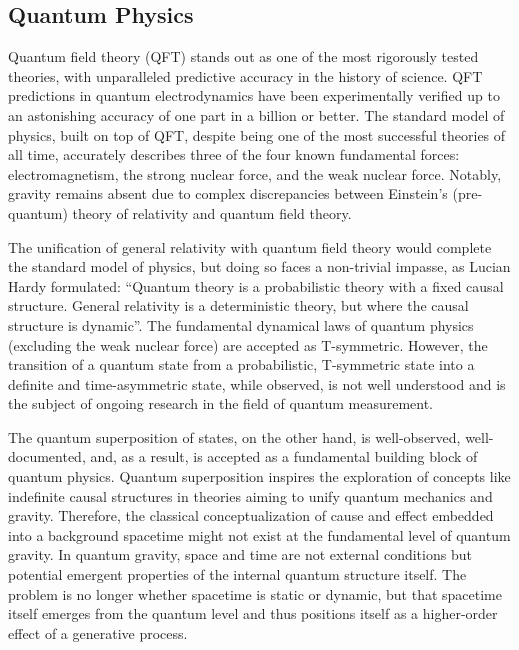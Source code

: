 \subsection{Quantum Physics}
\label{sec:history_quantum}

Quantum field theory\cite{peskin2018introduction} (QFT) stands out as one of the most rigorously tested theories, with unparalleled predictive accuracy in the history of science. QFT predictions in quantum electrodynamics have been experimentally verified up to an astonishing accuracy of one part in a billion or better. The standard model of physics, built on top of QFT, despite being one of the most successful theories of all time, accurately describes three of the four known fundamental forces: electromagnetism, the strong nuclear force, and the weak nuclear force. Notably, gravity remains absent due to complex discrepancies between Einstein’s (pre-quantum) theory of relativity and quantum field theory.

The unification of general relativity with quantum field theory would complete the standard model of physics, but doing so faces a non-trivial impasse, as Lucian Hardy formulated: ``Quantum theory is a probabilistic theory with a fixed causal structure. General relativity is a deterministic theory, but where the causal structure is dynamic''\cite{HardyDynamicCausalStructure}. The fundamental dynamical laws of quantum physics (excluding the weak nuclear force) are accepted as T-symmetric. However, the transition of a quantum state from a probabilistic, T-symmetric state into a definite and time-asymmetric state, while observed, is not well understood and is the subject of ongoing research in the field of quantum measurement.

The quantum superposition of states, on the other hand, is well-observed, well-documented, and, as a result, is accepted as a fundamental building block of quantum physics. Quantum superposition inspires the exploration of concepts like indefinite causal structures in theories aiming to unify quantum mechanics and gravity. Therefore, the classical conceptualization of cause and effect embedded into a background spacetime might not exist at the fundamental level of quantum gravity. In quantum gravity, space and time are not external conditions but potential emergent properties of the internal quantum structure itself. The problem is no longer whether spacetime is static or dynamic, but that spacetime itself emerges from the quantum level and thus positions itself as a higher-order effect of a generative process.

